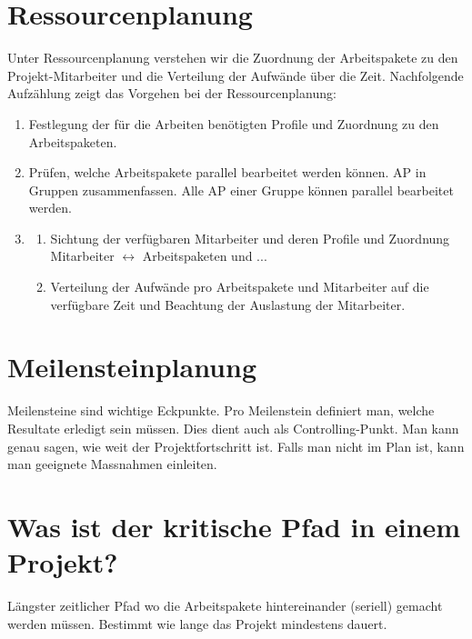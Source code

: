 \section{Ressourcenplanung}
\label{sec:ressourcenplanung}
Unter Ressourcenplanung verstehen wir die Zuordnung der Arbeitspakete zu den Projekt-Mitarbeiter und die Verteilung der Aufwände über die Zeit. Nachfolgende Aufzählung zeigt das Vorgehen bei der Ressourcenplanung:
\begin{enumerate}
	\item Festlegung der für die Arbeiten benötigten Profile und Zuordnung zu den Arbeitspaketen.
	\item Prüfen, welche Arbeitspakete parallel bearbeitet werden können. AP in Gruppen zusammenfassen. Alle AP einer Gruppe können parallel bearbeitet werden.
	\item 
	\begin{enumerate}
		\item Sichtung der verfügbaren Mitarbeiter und deren Profile und Zuordnung Mitarbeiter $\leftrightarrow$ Arbeitspaketen und ...
		\item Verteilung der Aufwände pro Arbeitspakete und Mitarbeiter auf die verfügbare Zeit und Beachtung der Auslastung der Mitarbeiter.
	\end{enumerate}
\end{enumerate}

\section{Meilensteinplanung}
\label{sec:meilensteinplanung}
Meilensteine sind wichtige Eckpunkte. Pro Meilenstein definiert man, welche Resultate erledigt sein müssen. Dies dient auch als Controlling-Punkt. Man kann genau sagen, wie weit der Projektfortschritt ist. Falls man nicht im Plan ist, kann man geeignete Massnahmen einleiten.

\section{Was ist der kritische Pfad in einem Projekt?}
Längster zeitlicher Pfad wo die Arbeitspakete hintereinander (seriell) gemacht werden müssen. Bestimmt wie lange das Projekt mindestens dauert.
